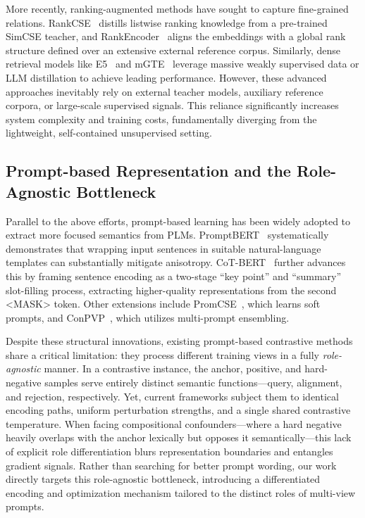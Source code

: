 \documentclass[lettersize,journal]{IEEEtran}
\begin{document}
More recently, ranking-augmented methods have sought to capture fine-grained relations. RankCSE~\cite{rankcse} distills listwise ranking knowledge from a pre-trained SimCSE teacher, and RankEncoder~\cite{rankencoder} aligns the embeddings with a global rank structure defined over an extensive external reference corpus. Similarly, dense retrieval models like E5~\cite{e5} and mGTE~\cite{gte} leverage massive weakly supervised data or LLM distillation to achieve leading performance. However, these advanced approaches inevitably rely on external teacher models, auxiliary reference corpora, or large-scale supervised signals. This reliance significantly increases system complexity and training costs, fundamentally diverging from the lightweight, self-contained unsupervised setting.

\subsection{Prompt-based Representation and the Role-Agnostic Bottleneck}

Parallel to the above efforts, prompt-based learning has been widely adopted to extract more focused semantics from PLMs. PromptBERT~\cite{promptbert} systematically demonstrates that wrapping input sentences in suitable natural-language templates can substantially mitigate anisotropy. CoT-BERT~\cite{cotbert} further advances this by framing sentence encoding as a two-stage ``key point'' and ``summary'' slot-filling process, extracting higher-quality representations from the second <MASK> token. Other extensions include PromCSE~\cite{promcse}, which learns soft prompts, and ConPVP~\cite{conpvp}, which utilizes multi-prompt ensembling.

Despite these structural innovations, existing prompt-based contrastive methods share a critical limitation: they process different training views in a fully \emph{role-agnostic} manner. In a contrastive instance, the anchor, positive, and hard-negative samples serve entirely distinct semantic functions---query, alignment, and rejection, respectively. Yet, current frameworks subject them to identical encoding paths, uniform perturbation strengths, and a single shared contrastive temperature. When facing compositional confounders---where a hard negative heavily overlaps with the anchor lexically but opposes it semantically---this lack of explicit role differentiation blurs representation boundaries and entangles gradient signals. Rather than searching for better prompt wording, our work directly targets this role-agnostic bottleneck, introducing a differentiated encoding and optimization mechanism tailored to the distinct roles of multi-view prompts.
\end{document}
